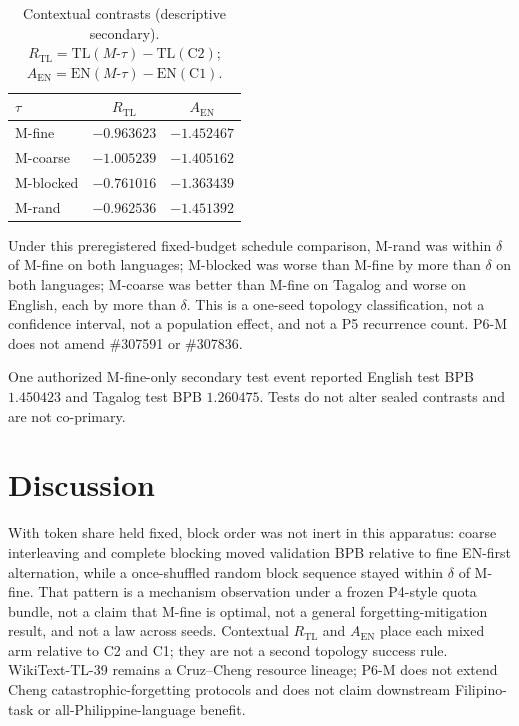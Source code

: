 \documentclass[11pt,a4paper]{article}
\begin{document}
\begin{table}[ht]
\centering
\caption{Contextual contrasts (descriptive secondary). $R_{\mathrm{TL}}=\mathrm{TL}(M\textrm{-}\tau)-\mathrm{TL}(\mathrm{C2})$; $A_{\mathrm{EN}}=\mathrm{EN}(M\textrm{-}\tau)-\mathrm{EN}(\mathrm{C1})$.}
\label{tab:contextual}
\begin{tabular}{lcc}
\toprule
$\tau$ & $R_{\mathrm{TL}}$ & $A_{\mathrm{EN}}$ \\
\midrule
M-fine & $-0.963623$ & $-1.452467$ \\
M-coarse & $-1.005239$ & $-1.405162$ \\
M-blocked & $-0.761016$ & $-1.363439$ \\
M-rand & $-0.962536$ & $-1.451392$ \\
\bottomrule
\end{tabular}
\end{table}

Under this preregistered fixed-budget schedule comparison, M-rand was within $\delta$ of M-fine on both languages; M-blocked was worse than M-fine by more than $\delta$ on both languages; M-coarse was better than M-fine on Tagalog and worse on English, each by more than $\delta$. This is a one-seed topology classification, not a confidence interval, not a population effect, and not a P5 recurrence count. P6-M does not amend \#307591 or \#307836.

One authorized M-fine-only secondary test event reported English test BPB $1.450423$ and Tagalog test BPB $1.260475$. Tests do not alter sealed contrasts and are not co-primary.

\section{Discussion}
\label{sec:disc}

With token share held fixed, block order was not inert in this apparatus: coarse interleaving and complete blocking moved validation BPB relative to fine EN-first alternation, while a once-shuffled random block sequence stayed within $\delta$ of M-fine. That pattern is a mechanism observation under a frozen P4-style quota bundle, not a claim that M-fine is optimal, not a general forgetting-mitigation result, and not a law across seeds. Contextual $R_{\mathrm{TL}}$ and $A_{\mathrm{EN}}$ place each mixed arm relative to C2 and C1; they are not a second topology success rule. WikiText-TL-39 remains a Cruz--Cheng resource lineage; P6-M does not extend Cheng catastrophic-forgetting protocols and does not claim downstream Filipino-task or all-Philippine-language benefit.
\end{document}
